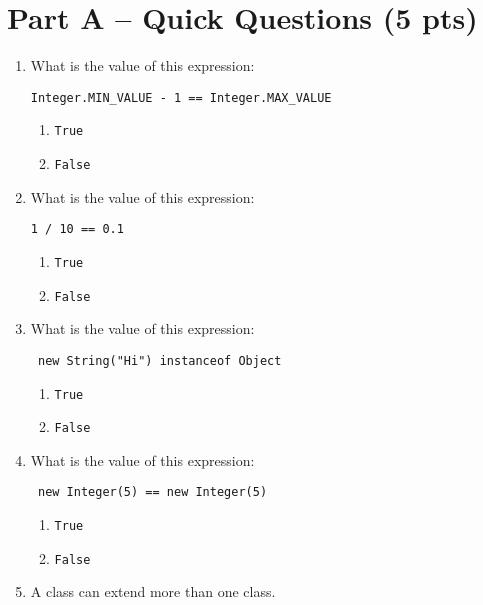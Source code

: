 \documentclass[S17-Final.tex]{subfiles}
\begin{document}
\section*{Part A -- Quick Questions (5 pts)}
\begin{enumerate}
\label{sec:one}

\item What is the value of this expression:
\begin{lstlisting}
Integer.MIN_VALUE - 1 == Integer.MAX_VALUE
\end{lstlisting}

\begin{enumerate}
\item  \texttt{True}  
\item  \texttt{False}
\end{enumerate}

\item What is the value of this expression: 
\begin{lstlisting}
1 / 10 == 0.1
\end{lstlisting}

\begin{enumerate}
\item  \texttt{True}
\item  \texttt{False}  
\end{enumerate}

\item What is the value of this expression:
\begin{lstlisting}
 new String("Hi") instanceof Object
\end{lstlisting}

\begin{enumerate}
\item  \texttt{True} 
\item  \texttt{False}  
\end{enumerate}

\item What is the value of this expression:
\begin{lstlisting}
 new Integer(5) == new Integer(5)
\end{lstlisting}

\begin{enumerate}
\item  \texttt{True}
\item  \texttt{False} 
\end{enumerate}

\item A class can extend more than one class.


\end{enumerate}
\end{document}
